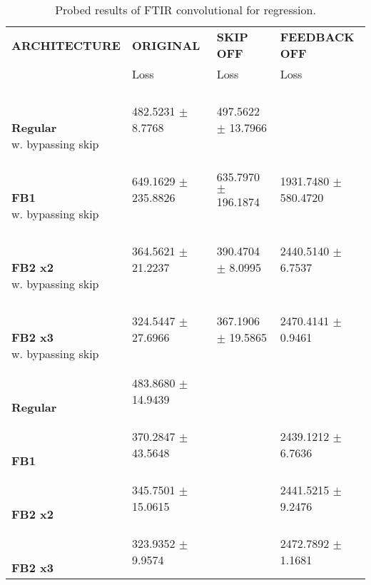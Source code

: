 
\begin{table}[h]
    \centering
    \begin{tabular}{|>{\columncolor{gray!05}}l|l|l|l|}
        \hline
        \rowcolor{gray!20}
        \textbf{\footnotesize ARCHITECTURE} & \textbf{\footnotesize ORIGINAL} & \textbf{\footnotesize SKIP OFF} & \textbf{\footnotesize FEEDBACK OFF} \\

        \rowcolor{gray!20}
        & {\footnotesize Loss} & {\footnotesize Loss} & {\footnotesize Loss} \\
        \hline
\shortstack[l]{\\ {} \\ \textbf{Regular}\\{w. bypassing skip}} & 482.5231 $\pm$ 8.7768 & 497.5622 $\pm$ 13.7966 &  \\
 \hline 
\shortstack[l]{\\ {} \\ \textbf{FB1}\\{w. bypassing skip}} & 649.1629 $\pm$ 235.8826 & 635.7970 $\pm$ 196.1874 & 1931.7480 $\pm$ 580.4720 \\
 \hline 
\shortstack[l]{\\ {} \\ \textbf{FB2 x2}\\{w. bypassing skip}} & 364.5621 $\pm$ 21.2237 & 390.4704 $\pm$ 8.0995 & 2440.5140 $\pm$ 6.7537 \\
 \hline 
\shortstack[l]{\\ {} \\ \textbf{FB2 x3}\\{w. bypassing skip}} & 324.5447 $\pm$ 27.6966 & 367.1906 $\pm$ 19.5865 & 2470.4141 $\pm$ 0.9461 \\
 \hline 
\shortstack[l]{\\ {} \\ \textbf{Regular}\\{}} & 483.8680 $\pm$ 14.9439 &  &  \\
 \hline 
\shortstack[l]{\\ {} \\ \textbf{FB1}\\{}} & 370.2847 $\pm$ 43.5648 &  & 2439.1212 $\pm$ 6.7636 \\
 \hline 
\shortstack[l]{\\ {} \\ \textbf{FB2 x2}\\{}} & 345.7501 $\pm$ 15.0615 &  & 2441.5215 $\pm$ 9.2476 \\
 \hline 
\shortstack[l]{\\ {} \\ \textbf{FB2 x3}\\{}} & 323.9352 $\pm$ 9.9574 &  & 2472.7892 $\pm$ 1.1681 \\
 \hline 

    \end{tabular}
    \caption{Probed results of FTIR convolutional for regression.}
    \label{tab:ftir-cnn-regression}
\end{table}
